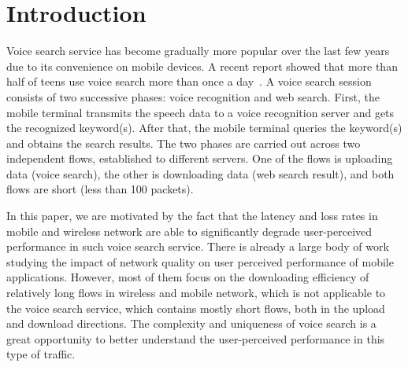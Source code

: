 
\section{Introduction}
\label{sec:intro}

Voice search service has become gradually more popular over the last few years due to its convenience on mobile devices. A recent report showed that more than half of teens use voice search more than once a day~\cite{voice_search_report}. A voice search session consists of two successive phases: voice recognition and web search. First, the mobile terminal transmits the speech data to a voice recognition server and gets the recognized keyword(s). After that, the mobile terminal queries the keyword(s) and obtains the search results. The two phases are carried out across two independent flows, established to different servers. One of the flows is uploading data (voice search), the other is downloading data (web search result), and both flows are short (less than 100 packets).

In this paper, we are motivated by the fact that the latency and loss rates in mobile and wireless network are able to significantly degrade user-perceived performance in such voice search service. There is already a large body of work \cite{sommers2012cell,yu2014can,chen2012network,sharma2010goodput} studying the impact of network quality on user perceived performance of mobile applications. However, most of them focus on the downloading efficiency of relatively long flows in wireless and mobile network, which is not applicable to the voice search service, which contains mostly short flows, both in the upload and download directions. The complexity and uniqueness of voice search is a great opportunity to better understand the user-perceived performance in this type of traffic.

